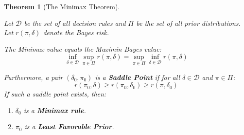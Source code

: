 \documentclass[
  letterpaper,
  DIV=11,
  numbers=noendperiod]{scrreprt}
\providecommand{\tightlist}{%
  \setlength{\itemsep}{0pt}\setlength{\parskip}{0pt}}
\renewcommand{\[}{\begin{equation}}
\renewcommand{\]}{\end{equation}}
\theoremstyle{definition}
\theoremstyle{plain}
\theoremstyle{plain}
\theoremstyle{plain}
\newtheorem{theorem}{Theorem}[chapter]
\theoremstyle{definition}
\theoremstyle{plain}
\theoremstyle{remark}
\begin{document}
\begin{theorem}[The Minimax
Theorem]\protect\hypertarget{thm-minimax}{}\label{thm-minimax}

Let \(\mathcal{D}\) be the set of all decision rules and \(\Pi\) be the
set of all prior distributions. Let \(r(\pi, \delta)\) denote the Bayes
risk.

The Minimax value equals the Maximin Bayes value:
\[ \inf_{\delta \in \mathcal{D}} \sup_{\pi \in \Pi} r(\pi, \delta) = \sup_{\pi \in \Pi} \inf_{\delta \in \mathcal{D}} r(\pi, \delta) \]

Furthermore, a pair \((\delta_0, \pi_0)\) is a \textbf{Saddle Point} if
for all \(\delta \in \mathcal{D}\) and \(\pi \in \Pi\):
\[ r(\pi_0, \delta) \ge r(\pi_0, \delta_0) \ge r(\pi, \delta_0) \] If
such a saddle point exists, then:

\begin{enumerate}
\def\labelenumi{\arabic{enumi}.}
\tightlist
\item
  \(\delta_0\) is a \textbf{Minimax rule}.
\item
  \(\pi_0\) is a \textbf{Least Favorable Prior}.
\end{enumerate}

\end{theorem}
\end{document}
